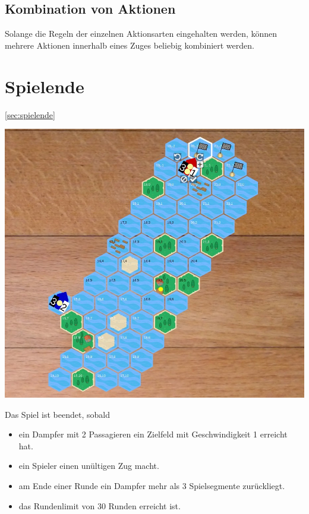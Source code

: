 \documentclass[12pt,a4paper, ngerman, oneside]{scrartcl}
\begin{document}
\subsection{Kombination von Aktionen}

Solange die Regeln der einzelnen Aktionsarten eingehalten werden, können mehrere
Aktionen innerhalb eines Zuges beliebig kombiniert werden.

\section{Spielende}\ref{sec:spielende}

\begin{centering}
  \includegraphics[width=\textwidth]{bilder/spielfeld-ziel.jpg}
\end{centering}

Das Spiel ist beendet, sobald

\begin{itemize}
\item ein Dampfer mit 2 Passagieren ein Zielfeld mit Geschwindigkeit 1 erreicht hat.
\item ein Spieler einen unültigen Zug macht.
\item am Ende einer Runde ein Dampfer mehr als 3 Spielsegmente zurückliegt.
  \item das Rundenlimit von 30 Runden erreicht ist.
\end{itemize}
\end{document}
